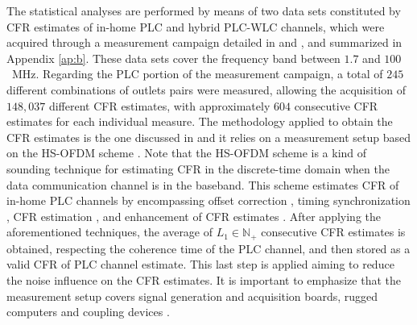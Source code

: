 The statistical analyses are performed by means of two data sets constituted by \ac{CFR} estimates of in-home \ac{PLC} and hybrid \ac{PLC}-\ac{WLC} channels, which were acquired through a measurement campaign detailed in \cite{Thiago:Characterization} and \cite{thiago:hyb}, and summarized in Appendix \ref{ap:b}. These data sets cover the frequency band between $1.7$ and $100$~MHz. Regarding the \ac{PLC} portion of the measurement campaign, a total of $245$ different combinations of outlets pairs were measured, allowing the acquisition of $148,037$ different \ac{CFR} estimates, with approximately $604$ consecutive \ac{CFR} estimates for each individual measure. The methodology applied to obtain the \ac{CFR} estimates is the one discussed in \cite{Thiago:FR} and it relies on a measurement setup based on the \ac{HS-OFDM} scheme \cite{Moises:OFDM,Picorone}. Note that the \ac{HS-OFDM} scheme is a kind of sounding technique for estimating \ac{CFR} in the discrete-time domain when the data communication channel is in the baseband. This scheme estimates \ac{CFR} of in-home \ac{PLC} channels by encompassing offset correction \cite{Gardner:Interpolation}, timing synchronization \cite{Hanzo:OFDMSync}, \ac{CFR} estimation \cite{Thiago:FR}, and enhancement of \ac{CFR} estimates \cite{Cardoso:CEzeropad,Ouzzif:CP}. After applying the aforementioned techniques, the average of $L_1 \in \mathbb{N}_+$ consecutive \ac{CFR} estimates is obtained, respecting the coherence time of the \ac{PLC} channel, and then stored as a valid \ac{CFR} of \ac{PLC} channel estimate. This last step is applied aiming to reduce the noise influence on the \ac{CFR} estimates. It is important to emphasize that the measurement setup covers signal generation and acquisition boards, rugged computers and coupling devices \cite{Luis:AI,Coupling:PLC}.

